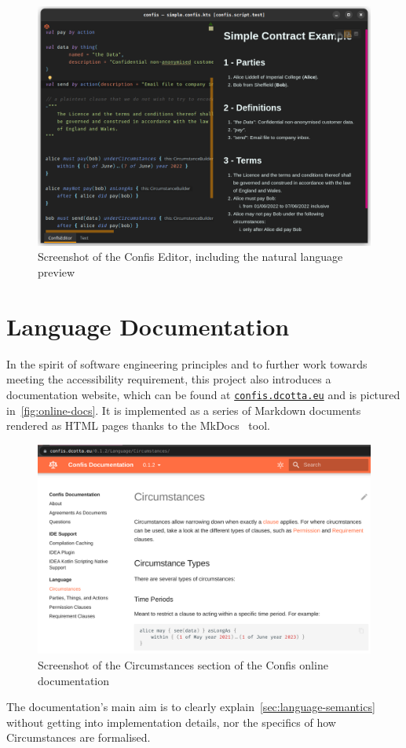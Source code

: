 \begin{figure}[h]
    \centering
    \includegraphics[width=\textwidth]{figures/simple.confis.editor}
    \caption{Screenshot of the Confis Editor, including the natural language preview}
    \label{fig:confis.minimal.editor}
\end{figure}


\section{Language Documentation}\label{sec:language-documentation}

In the spirit of software engineering principles and to further work towards meeting the accessibility requirement, this project also introduces a documentation website, which can be found at \href{https://confis.dcotta.eu}{\texttt{confis.dcotta.eu}} and is pictured in~\autoref{fig:online-docs}.
It is implemented as a series of Markdown documents rendered as HTML pages thanks to the MkDocs~\cite{mkDocs} tool.

\begin{figure}[h]
    \centering
    \includegraphics[width=\textwidth]{figures/online-docs}
    \caption{Screenshot of the Circumstances section of the Confis online documentation}
    \label{fig:online-docs}
\end{figure}

The documentation's main aim is to clearly explain~\autoref{sec:language-semantics} without getting into implementation details, nor the specifics of how Circumstances are formalised.


